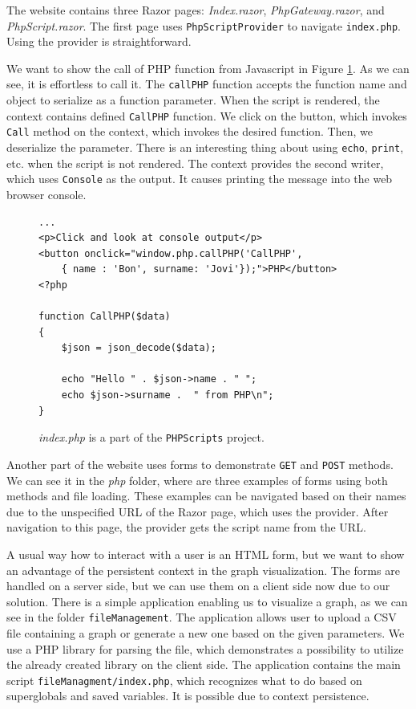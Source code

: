 The website contains three Razor pages: \textit{Index.razor}, \textit{PhpGateway.razor}, and \textit{PhpScript.razor}.
The first page uses \texttt{PhpScriptProvider} to navigate \texttt{index.php}.
Using the provider is straightforward.
\par
We want to show the call of PHP function from Javascript in Figure \ref{img26:index}.
As we can see, it is effortless to call it.
The \texttt{callPHP} function accepts the function name and object to serialize as a function parameter.
When the script is rendered, the context contains defined \texttt{CallPHP} function.
We click on the button, which invokes \texttt{Call} method on the context, which invokes the desired function.
Then, we deserialize the parameter.
There is an interesting thing about using \texttt{echo}, \texttt{print}, etc. when the script is not rendered.
The context provides the second writer, which uses \texttt{Console} as the output.
It causes printing the message into the web browser console.
\begin{figure}
\begin{lstlisting}
...
<p>Click and look at console output</p>
<button onclick="window.php.callPHP('CallPHP',
	{ name : 'Bon', surname: 'Jovi'});">PHP</button>
<?php

function CallPHP($data)
{
    $json = json_decode($data); 

	echo "Hello " . $json->name . " ";
	echo $json->surname .  " from PHP\n";
}
\end{lstlisting}
\caption{\textit{index.php} is a part of the \texttt{PHPScripts} project.}
\label{img26:index}
\end{figure}
\par
Another part of the website uses forms to demonstrate \texttt{GET} and \texttt{POST} methods.
We can see it in the \textit{php} folder, where are three examples of forms using both methods and file loading.
These examples can be navigated based on their names due to the unspecified URL of the Razor page, which uses the provider.
After navigation to this page, the provider gets the script name from the URL.
\par
A usual way how to interact with a user is an HTML form, but we want to show an advantage of the persistent context in the graph visualization.
The forms are handled on a server side, but we can use them on a client side now due to our solution.
There is a simple application enabling us to visualize a graph, as we can see in the folder \texttt{fileManagement}.
The application allows user to upload a CSV file containing a graph or generate a new one based on the given parameters.
We use a PHP library for parsing the file, which demonstrates a possibility to utilize the already created library on the client side.
The application contains the main script \texttt{fileManagment/index.php}, which recognizes what to do based on superglobals and saved variables.
It is possible due to context persistence.

